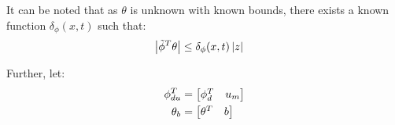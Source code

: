 It can be noted that as $\theta$ is unknown with known bounds, there exists a
known function $\delta_\phi(x, t)$ such that:
\begin{align}
    \left\lvert \tilde \phi^T \theta \right\rvert &\leq \delta_\phi(x, t) \left\lvert z \right\rvert
\end{align}


Further, let:
\begin{align}
    \phi_{du}^T &= \begin{bmatrix} \phi_d^T & u_m \end{bmatrix}\\
    \theta_{b} &= \begin{bmatrix} \theta^T & b \end{bmatrix}
\end{align}
